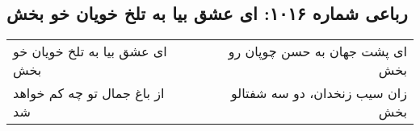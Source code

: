 \begin{center}
\section*{رباعی شماره ۱۰۱۶: ای عشق بیا به تلخ خویان خو بخش}
\label{sec:1016}
\begin{longtable}{l p{0.5cm} r}
ای عشق بیا به تلخ خویان خو بخش
&&
ای پشت جهان به حسن چوپان رو بخش
\\
از باغ جمال تو چه کم خواهد شد
&&
زان سیب زنخدان، دو سه شفتالو بخش
\\
\end{longtable}
\end{center}
